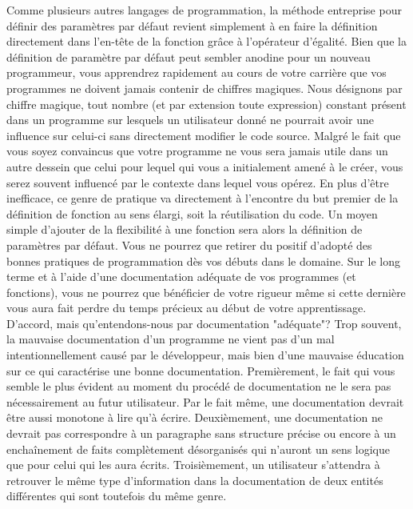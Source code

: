 \vspace{\baselineskip}
Comme plusieurs autres langages de programmation, la méthode entreprise pour définir des paramètres par défaut revient simplement à en faire la définition directement dans l'en-tête de la fonction grâce à l'opérateur d'égalité. Bien que la définition de paramètre par défaut peut sembler anodine pour un nouveau programmeur, vous apprendrez rapidement au cours de votre carrière que vos programmes ne doivent jamais contenir de chiffres magiques. Nous désignons par chiffre magique, tout nombre (et par extension toute expression) constant présent dans un programme sur lesquels un utilisateur donné ne pourrait avoir une influence sur celui-ci sans directement modifier le code source. Malgré le fait que vous soyez convaincus que votre programme ne vous sera jamais utile dans un autre dessein que celui pour lequel qui vous a initialement amené à le créer, vous serez souvent influencé par le contexte dans lequel vous opérez. En plus d'être inefficace, ce genre de pratique va directement à l'encontre du but premier de la définition de fonction au sens élargi, soit la réutilisation du code. Un moyen simple d'ajouter de la flexibilité à une fonction sera alors la définition de paramètres par défaut. Vous ne pourrez que retirer du positif d'adopté des bonnes pratiques de programmation dès vos débuts dans le domaine. Sur le long terme et à l'aide d'une documentation adéquate de vos programmes (et fonctions), vous ne pourrez que bénéficier de votre rigueur même si cette dernière vous aura fait perdre du temps précieux au début de votre apprentissage. \\

D'accord, mais qu'entendons-nous par documentation "adéquate"? Trop souvent, la mauvaise documentation d'un programme ne vient pas d'un mal intentionnellement causé par le développeur, mais bien d'une mauvaise éducation sur ce qui caractérise une bonne documentation. Premièrement, le fait qui vous semble le plus évident au moment du procédé de documentation ne le sera pas nécessairement au futur utilisateur.  Par le fait même, une documentation devrait être aussi monotone à lire qu'à écrire. Deuxièmement, une documentation ne devrait pas correspondre à un paragraphe sans structure précise ou encore à un enchaînement de faits complètement désorganisés qui n'auront un sens logique que pour celui qui les aura écrits. Troisièmement, un utilisateur s'attendra à retrouver le même type d'information dans la documentation de deux entités différentes qui sont toutefois du même genre. \\

